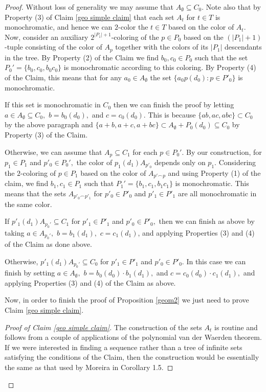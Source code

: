 \documentclass[10pt,a4paper]{article}
\theoremstyle{definition}
\begin{document}
\begin{proof}
Without loss of generality we may assume that $A_\emptyset\subseteq C_0.$  Note also that by Property (3) of Claim \ref{geo simple claim} that each set $A_t$ for $t\in T$ is monochromatic, and hence we can $2$-color the $t\in T$ based on the color of $A_t$.  Now, consider an auxiliary $2^{|P_1|+1}$-coloring of the $p\in P_0$ based on the $(|P_1|+1)$-tuple consisting of the color of $A_p$ together with the colors of its $|P_1|$ descendants in the tree.  By Property (2) of the Claim we find $b_0,c_0\in P_0$ such that the set $P_0'=\{{b_0}, {c_0}, {b_0c_0}\}$ is monochromatic according to this coloring.  By Property (4) of the Claim, this means that for any $a_0\in A_\emptyset$ the set $\{a_0p(d_0): p\in P'_0\}$ is monochromatic.

If this set is monochromatic in $C_0$ then we can finish the proof by letting $a\in A_\emptyset\subseteq C_0,$ $b={b_0(d_0)},$ and $c={c_0(d_0)}.$ This is because $\{ab,ac,abc\}\subset C_0$ by the above paragraph and $\{a+b,a+c,a+bc\}\subset A_\emptyset+P_0(d_0)\subseteq C_0$ by Property (3) of the Claim.

Otherwise, we can assume that $A_{p}\subseteq C_1$ for each $p\in P_0'.$  By our construction, for $p_1\in P_1$ and $p'_0
\in P_0',$ the color of $p_1(d_1)A_{p'_0}$ depends only on $p_1.$  Considering the $2$-coloring of $p\in P_1$ based on the color of $A_{p'\smallfrown p}$ and using Property (1) of the claim, we find $b_1,c_1\in P_1$ such that $P_1'=\{{b_1}, {c_1}, {b_1c_1}\}$ is monochromatic.  This means that the sets $A_{p'_0\smallfrown p'_1}$ for $p'_0\in P'_0$ and $p'_1\in P'_1$ are all monochromatic in the same color.

If $p'_1(d_1)A_{p_0'}\subseteq C_1$ for $p'_1\in P'_1$ and $p'_0\in P'_0,$ then we can finish as above by taking $a\in A_{p_0'},$ $b={b_1(d_1)},$ $c={c_1(d_1)}$, and applying Properties (3) and (4) of the Claim as done above.

Otherwise, $p'_1(d_1)A_{p_0'}\subseteq C_0$ for $p'_1\in P'_1$ and $p'_0\in P'_0.$  In this case we can finish by setting $a\in A_\emptyset,$ $b={b_0}(d_0)\cdot {b_1(d_1)},$ and $c={c_0(d_0)}\cdot {c_1(d_1)},$ and applying Properties (3) and (4) of the Claim as above.



Now, in order to finish the proof of Proposition \ref{geom2} we just need to prove Claim \ref{geo simple claim}.

\begin{proof}[Proof of Claim \ref{geo simple claim}]
The construction of the sets $A_t$ is routine and follows from a couple of applications of the polynomial van der Waerden theorem.  If we were interested in finding a sequence rather than a tree of infinite sets satisfying the conditions of the Claim, then the construction would be essentially the same as that used by Moreira in \cite{moreira2017monochromatic} Corollary 1.5.


\end{proof}
\end{proof}
\end{document}
